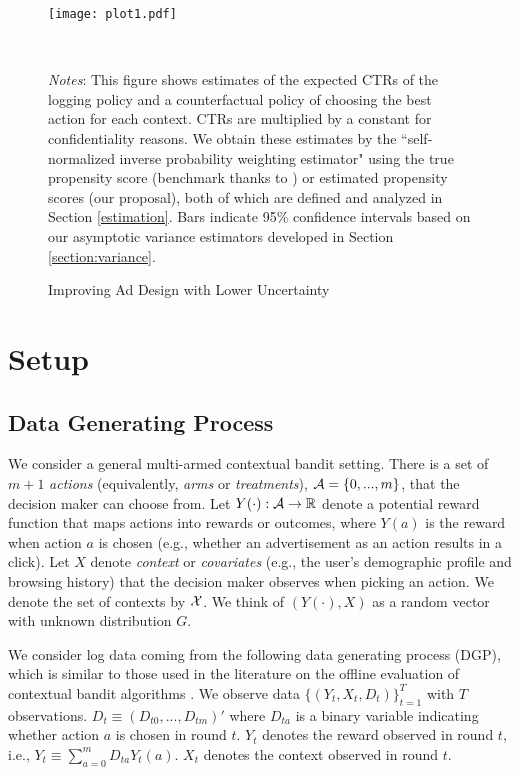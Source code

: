 \documentclass[letterpaper]{article} \usepackage{aaai19}  \usepackage{times}  \usepackage{helvet}  \usepackage{courier}  \usepackage{url}  \usepackage{graphicx}  \frenchspacing  \usepackage{comment}
\newcommand{\citet}[1]
{\citeauthor{#1} \shortcite{#1}}
\newcommand{\citep}{\cite}
\begin{document}
\begin{figure}
\begin{center}
 \texttt{[image: plot1.pdf]}
\end{center}
\caption{Improving Ad Design with Lower Uncertainty}\label{figure}\par
~\par
         \fontsize{9.0pt}{10.0pt}\selectfont \textit{Notes}: This figure shows estimates of the expected CTRs of the logging policy and a counterfactual policy of choosing the best action for each context. 
         CTRs are multiplied by a constant for confidentiality reasons. 
         We obtain these estimates by the ``self-normalized inverse probability weighting estimator" using the true propensity score (benchmark thanks to \citet{Swaminathan2015b}) or estimated propensity scores (our proposal), both of which are defined and analyzed in Section \ref{estimation}. 
         Bars indicate 95\% confidence intervals based on our asymptotic variance estimators developed in Section \ref{section:variance}.
\end{figure} 




\section{Setup}\label{model}

\subsection{Data Generating Process}\label{dgp}

We consider a general multi-armed contextual bandit setting. 
There is a set of $m+1$ \textit{actions} (equivalently, \textit{arms} or \textit{treatments}), ${\cal A}=\{0,...,m\}$, that the decision maker can choose from.
Let $Y(\cdot): {\cal A}\rightarrow \mathbb{R}$ denote a potential reward function that maps actions into rewards or outcomes, where $Y(a)$ is the reward when action $a$ is chosen (e.g., whether an advertisement as an action results in a click).
Let $X$ denote \textit{context} or \textit{covariates} (e.g., the user's demographic profile and browsing history) that the decision maker observes when picking an action. 
We denote the set of contexts by ${\cal X}$.
We think of $(Y(\cdot),X)$ as a random vector with unknown distribution $G$.

We consider log data coming from the following data generating process (DGP), which is similar to those used in the literature on the offline evaluation of contextual bandit algorithms \citep{li2010contextual,Strehl2010,li2011unbiased,Li2012,Swaminathan2015,Swaminathan2015b,swaminathan2017off}.
We observe data $\{(Y_t,X_t,D_t)\}_{t=1}^T$ with $T$ observations. 
$D_t\equiv(D_{t0},...,D_{tm})'$ where $D_{ta}$ is a binary variable indicating whether action $a$ is chosen in round $t$. 
$Y_t$ denotes the reward observed in round $t$, i.e., $Y_t\equiv \sum_{a=0}^{m}D_{ta}Y_t(a)$. 
$X_t$ denotes the context observed in round $t$.
\end{document}

